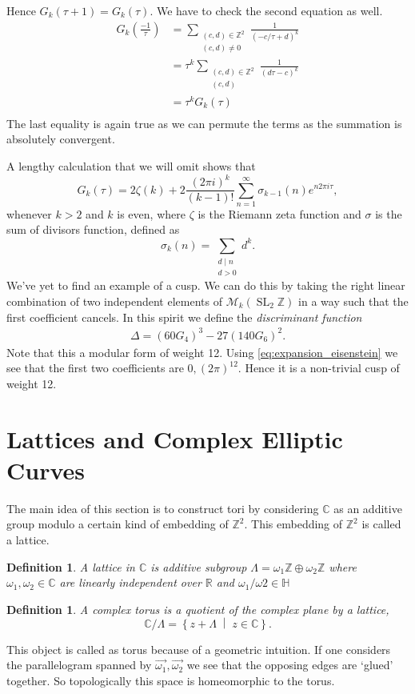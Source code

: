 \documentclass[a4paper]{article}
\theoremstyle{theoremdd}
\theoremstyle{definitiondd}
\newtheorem{definition}[theorem]{Definition}
\theoremstyle{remarkdd}
\newcommand{\Z}{\mathbb{Z}}
\newcommand{\C}{\mathbb{C}}
\newcommand{\R}{\mathbb{R}}
\newcommand{\bigset}[2]{ \left\{ #1 \;\middle|\; #2 \right\} }
\DeclareMathOperator{\SL}{SL}
\begin{document}
Hence $G_k(\tau + 1) = G_k(\tau)$.
We have to check the second equation as well.
\begin{align*}
	G_k\left(\frac{-1}{\tau}\right) &=  \sum_{\substack{(c,d) \in \Z^2 \\ (c,d) \ne 0}} \frac{1}{(-c / \tau + d)^{k}}\\
			     &= \tau^{k} \sum_{\substack{(c, d) \in \Z^2 \\ (c,d)}} \frac{1}{(d \tau - c)^{k}} \\
			     &= \tau^{k}G_k(\tau) \\
\end{align*}
The last equality is again true as we can permute the terms as the summation is absolutely convergent.

A lengthy calculation that we will omit shows that \begin{equation}\label{eq:expansion_eisenstein}
	G_k(\tau) = 2 \zeta(k) + 2 \frac{(2\pi i)^{k}}{(k-1)!}\sum_{n = 1}^{\infty} \sigma_{k-1}(n)  e^{n 2 \pi i \tau}
,\end{equation}
whenever $ k>2$ and $k$ is even, where $\zeta$ is the Riemann zeta function and $\sigma$ is the sum of divisors function, defined as
\[
	\sigma_{k}(n) = \sum_{\substack{d \mathbin | n \\ d > 0}} d^{k}
.\] 
We've yet to find an example of a cusp. We can do this by taking the right linear combination of two independent elements of $\mathcal{M} _k(\SL_2\Z)$ in a way such that the first coefficient cancels.
In this spirit we define the \emph{discriminant function}
\begin{align*}
	\Delta = (60 G_4)^3 - 27(140G_6)^2
.\end{align*}
Note that this a modular form of weight 12. 
Using \cref{eq:expansion_eisenstein} we see that the first two coefficients are $0, (2 \pi)^{12}$. 
Hence it is a non-trivial cusp of weight 12. 

\section{Lattices and Complex Elliptic Curves}
The main idea of this section is to construct tori by considering $\C$ as an additive group modulo a certain kind of embedding of $\Z^2$. This embedding of $\Z^2$ is called a lattice.  
\begin{definition}
	A \emph{lattice in $\C$} is additive subgroup $\Lambda = \omega_1 \Z \oplus \omega_2 \Z$ where $\omega_1, \omega_2 \in \C$ are linearly independent over $\R$ and $\omega_1 / \omega 2  \in \mathbb{H}$
\end{definition}
\begin{definition}
	A \emph{complex torus} is a quotient of the complex plane by a lattice, \[
		\C / \Lambda = \bigset{z + \Lambda}{z \in \C} 
	.\] 
\end{definition}
This object is called as torus because of a geometric intuition. 
If one considers the parallelogram spanned by $\vec{\omega_1}, \vec{\omega_2}$ we see that the opposing edges are `glued' together. 
So topologically this space is homeomorphic to the torus. 
\end{document}
